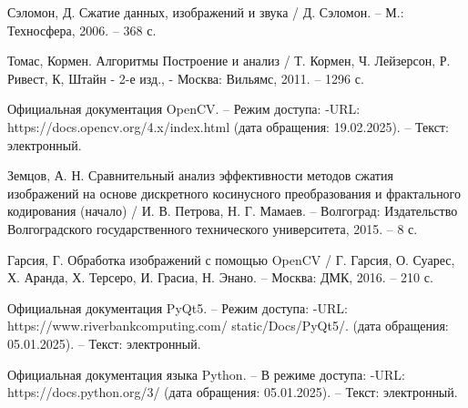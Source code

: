 
\begin{thebibliography}{9}

     Сэломон, Д. Сжатие данных, изображений и звука / Д. Сэломон. – М.: Техносфера, 2006. –
    368 с.



     Томас, Кормен. Алгоритмы Построение и анализ / Т. Кормен,  Ч. Лейзерсон, Р. Ривест, К, Штайн 
    - 2-е изд., - Москва: Вильямс, 2011. -- 1296 с.


     Официальная документация OpenCV. – Режим доступа: -URL: https://docs.opencv.org/4.x/index.html (дата обращения: 19.02.2025). – Текст: электронный.


     Земцов, А. Н. Сравнительный анализ эффективности методов сжатия изображений на основе дискретного косинусного преобразования и фрактального кодирования (начало) /
    И. В. Петрова, Н. Г. Мамаев. –  Волгоград: Издательство Волгоградского государственного технического университета, 2015. – 8 с.

     Гарсия, Г. Обработка изображений с помощью OpenCV / Г. Гарсия, О. Суарес, Х. Аранда, Х. Терсеро, И. Грасиа, Н. Энано.
    – Москва: ДМК, 2016. – 210 с.


    
     Официальная документация PyQt5. – Режим доступа: -URL: https://www.riverbankcomputing.com/ static/Docs/PyQt5/. (дата обращения: 05.01.2025). – Текст: электронный.

     Официальная документация языка Python. – В режиме доступа: -URL: https://docs.python.org/3/ (дата обращения: 05.01.2025). – Текст: электронный.
    
    \end{thebibliography}